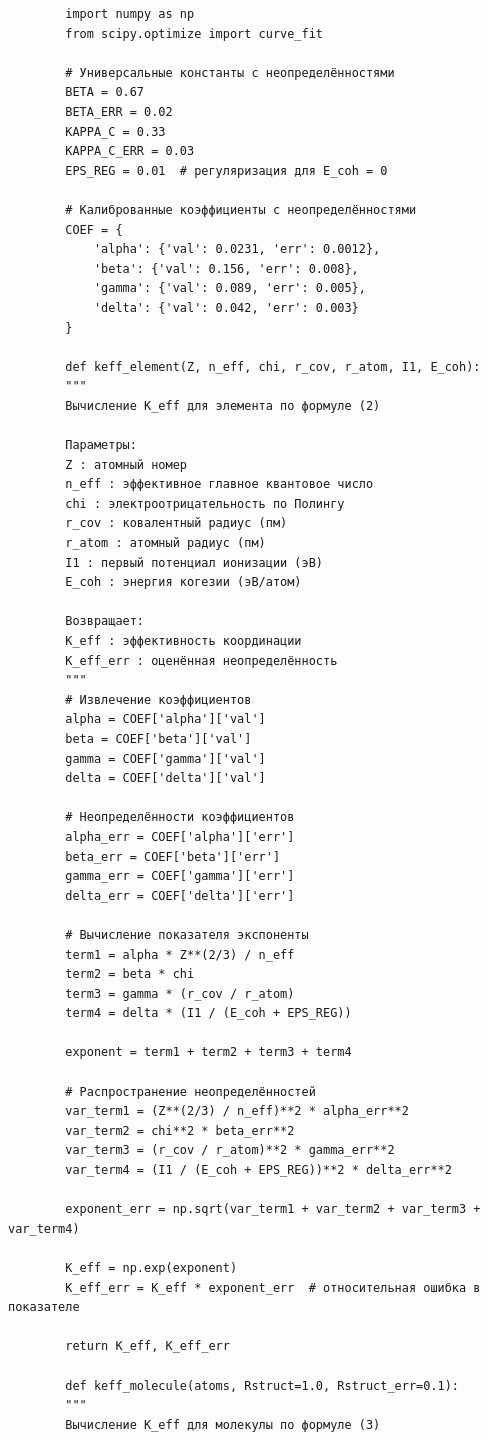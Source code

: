 \documentclass[12pt,a4paper]{article}
\theoremstyle{remark}
\begin{document}
	\begin{verbatim}
		import numpy as np
		from scipy.optimize import curve_fit
		
		# Универсальные константы с неопределённостями
		BETA = 0.67
		BETA_ERR = 0.02
		KAPPA_C = 0.33
		KAPPA_C_ERR = 0.03
		EPS_REG = 0.01  # регуляризация для E_coh = 0
		
		# Калиброванные коэффициенты с неопределённостями
		COEF = {
			'alpha': {'val': 0.0231, 'err': 0.0012},
			'beta': {'val': 0.156, 'err': 0.008},
			'gamma': {'val': 0.089, 'err': 0.005},
			'delta': {'val': 0.042, 'err': 0.003}
		}
		
		def keff_element(Z, n_eff, chi, r_cov, r_atom, I1, E_coh):
		"""
		Вычисление K_eff для элемента по формуле (2)
		
		Параметры:
		Z : атомный номер
		n_eff : эффективное главное квантовое число
		chi : электроотрицательность по Полингу
		r_cov : ковалентный радиус (пм)
		r_atom : атомный радиус (пм)
		I1 : первый потенциал ионизации (эВ)
		E_coh : энергия когезии (эВ/атом)
		
		Возвращает:
		K_eff : эффективность координации
		K_eff_err : оценённая неопределённость
		"""
		# Извлечение коэффициентов
		alpha = COEF['alpha']['val']
		beta = COEF['beta']['val']
		gamma = COEF['gamma']['val']
		delta = COEF['delta']['val']
		
		# Неопределённости коэффициентов
		alpha_err = COEF['alpha']['err']
		beta_err = COEF['beta']['err']
		gamma_err = COEF['gamma']['err']
		delta_err = COEF['delta']['err']
		
		# Вычисление показателя экспоненты
		term1 = alpha * Z**(2/3) / n_eff
		term2 = beta * chi
		term3 = gamma * (r_cov / r_atom)
		term4 = delta * (I1 / (E_coh + EPS_REG))
		
		exponent = term1 + term2 + term3 + term4
		
		# Распространение неопределённостей
		var_term1 = (Z**(2/3) / n_eff)**2 * alpha_err**2
		var_term2 = chi**2 * beta_err**2
		var_term3 = (r_cov / r_atom)**2 * gamma_err**2
		var_term4 = (I1 / (E_coh + EPS_REG))**2 * delta_err**2
		
		exponent_err = np.sqrt(var_term1 + var_term2 + var_term3 + var_term4)
		
		K_eff = np.exp(exponent)
		K_eff_err = K_eff * exponent_err  # относительная ошибка в показателе
		
		return K_eff, K_eff_err
		
		def keff_molecule(atoms, Rstruct=1.0, Rstruct_err=0.1):
		"""
		Вычисление K_eff для молекулы по формуле (3)
		

\end{verbatim}
\end{document}
